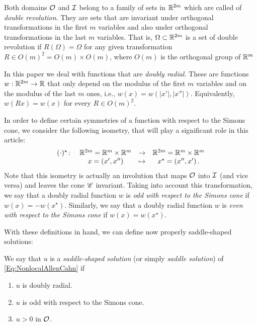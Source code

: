Both domains $\mathcal{O}$ and $\mathcal{I}$ belong to a family of sets in $\mathbb{R}^{2m}$ which are called of \emph{double revolution}. They are sets that are invariant under orthogonal transformations in the first $m$ variables and also under orthogonal transformations in the last $m$ variables. That is, $\Omega\subset \mathbb{R}^{2m}$ is a set of double revolution if $R(\Omega) = \Omega$ for any given transformation $R\in O(m)^2 = O(m) \times O(m)$, where  $O(m)$ is the orthogonal group of $\mathbb{R}^m$

In this paper we deal with functions that are \emph{doubly radial}. These are functions $w:\mathbb{R}^{2m}  \to \mathbb{R}$ that only depend on the modulus of the first $m$ variables and on the modulus of the last $m$ ones, i.e., $w(x) = w(|x'|,|x''|)$. Equivalently, $w(Rx) = w(x)$ for every $R \in O(m)^2$.

In order to define certain symmetries of a function with respect to the Simons cone, we consider the following isometry, that will play a significant role in this article:
\begin{equation}
\label{Eq:DefStar}
\begin{matrix}
(\cdot)^\star \colon & \mathbb{R}^{2m}= \mathbb{R}^{m}\times \mathbb{R}^{m}  &\to&  \mathbb{R}^{2m}= \mathbb{R}^{m}\times \mathbb{R}^{m}  \\
& x = (x',x'') &\mapsto & x^\star = (x'',x')\,.
\end{matrix}
\end{equation}
Note that this isometry is actually an involution that maps $\mathcal{O}$ into $\mathcal{I}$ (and vice versa) and leaves the cone $\mathscr{C}$ invariant. Taking into account this transformation, we say that a doubly radial function $w$ is \emph{odd with respect to the Simons cone} if $w(x) = -w(x^\star)$. Similarly, we say that a doubly radial function $w$ is \emph{even with respect to the Simons cone} if $w(x) = w(x^\star)$.


With these definitions in hand, we can define now properly saddle-shaped solutions:
\begin{definition}
	\label{Def:SaddleShapedSol}
	We say that $u$ is a \emph{saddle-shaped solution} (or simply \emph{saddle solution}) of \eqref{Eq:NonlocalAllenCahn} if
	\begin{enumerate}
		\item $u$ is doubly radial.
		\item $u$ is odd with respect to the Simons cone.
		\item $u > 0$ in $\mathcal{O}$.
	\end{enumerate}
\end{definition}


